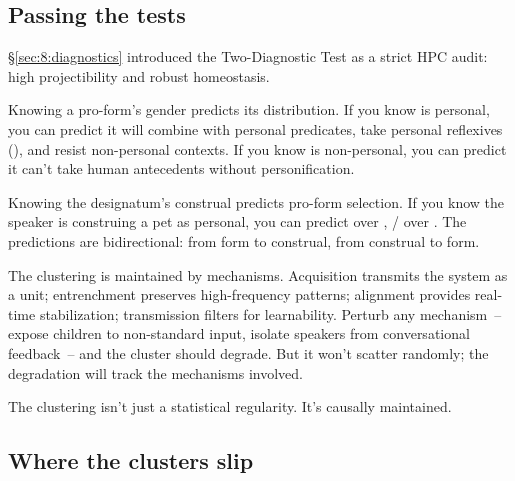 \subsection{Passing the tests}
\label{sec:12:tests}

§\ref{sec:8:diagnostics} introduced the Two-Diagnostic Test as a strict HPC audit: high projectibility and robust homeostasis.

Knowing a pro-form's gender predicts its distribution. If you know  is personal, you can predict it will combine with personal predicates, take personal reflexives (), and resist non-personal contexts. If you know  is non-personal, you can predict it can't take human antecedents without personification.

Knowing the designatum's construal predicts pro-form selection. If you know the speaker is construing a pet as personal, you can predict  over , / over . The predictions are bidirectional: from form to construal, from construal to form.

The clustering is maintained by mechanisms. Acquisition transmits the system as a unit; entrenchment preserves high-frequency patterns; alignment provides real-time stabilization; transmission filters for learnability. Perturb any mechanism~-- expose children to non-standard input, isolate speakers from conversational feedback~-- and the cluster should degrade. But it won't scatter randomly; the degradation will track the mechanisms involved.

The clustering isn't just a statistical regularity. It's causally maintained.

\subsection{Where the clusters slip}
\label{sec:12:slippage}

